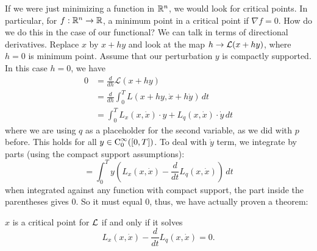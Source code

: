If we were just minimizing a function in $\mathbb{R}^n$, we would look for critical points. In particular, for $f:\mathbb{R}^n \to \mathbb{R}$, a minimum point in a critical point if $\nabla f = 0$. How do we do this in the case of our functional? We can talk in terms of directional derivatives. Replace $x$ by $x+hy$ and look at the map $h\to \mathcal{L}(x+hy)$, where $h=0$ is minimum point. Assume that our perturbation $y$ is compactly supported. In this case $h=0$, we have
\[
    \begin{aligned}
        0 &=\frac{d}{d h} \mathcal{L}(x+h y) \\
        &=\frac{d}{d h} \int_{0}^{T} L(x+h y, \dot{x}+h \dot{y})\, d t \\
        &=\int_{0}^{T} L_{x}(x, \dot{x}) \cdot y+L_{q}(x,\dot{x}) \cdot \dot{y}\, d t
    \end{aligned}
\]
where we are using $q$ as a placeholder for the second variable, as we did with $p$ before. This holds for all $y\in \operatorname{C}_0^\infty([0,T])$. To deal with $\dot y$ term, we integrate by parts (using the compact support assumptions): 
\[
    = \int_0^T y(L_x(x,\dot x) - \frac d {dt}L_q(x,\dot x)) \, dt
\]
when integrated against any function with compact support, the part inside the parentheses gives $0$. So it must equal $0$, thus, we have actually proven a theorem:
\begin{theorem}
     $x$ is a critical point for $\mathcal{L}$ if and only if it solves 
    \[
        L_x(x, \dot x) - \frac{d}{dt}L_q(x,\dot x) = 0.
    \]
\end{theorem}
